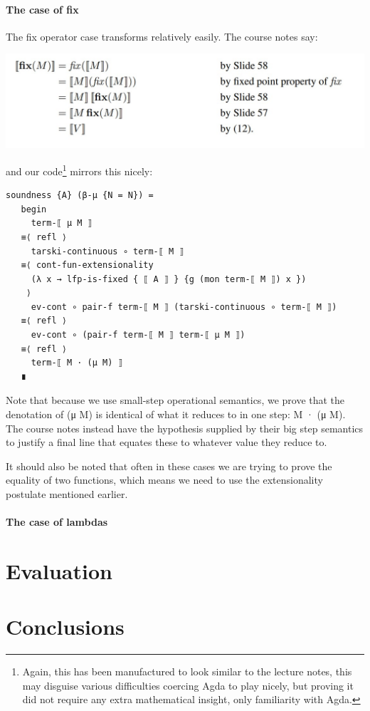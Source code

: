 \documentclass[12pt,a4paper,twoside,openright]{report}
\begin{document}
\subsubsection{The case of fix}
The fix operator case transforms relatively easily. The course notes say:
\begin{center}
\includegraphics[scale = 0.7]{figs/fix_soundness}
\end{center}
and our code\footnote{Again, this has been manufactured to look similar to the lecture notes, this may disguise various difficulties coercing Agda to play nicely, but proving it did not require any extra mathematical insight, only familiarity with Agda.} mirrors this nicely:
\begin{verbatim}
soundness {A} (β-μ {N = N}) =
   begin
     term-⟦ μ M ⟧
   ≡⟨ refl ⟩
     tarski-continuous ∘ term-⟦ M ⟧
   ≡⟨ cont-fun-extensionality
     (λ x → lfp-is-fixed { ⟦ A ⟧ } {g (mon term-⟦ M ⟧) x })
    ⟩
     ev-cont ∘ pair-f term-⟦ M ⟧ (tarski-continuous ∘ term-⟦ M ⟧)
   ≡⟨ refl ⟩
     ev-cont ∘ (pair-f term-⟦ M ⟧ term-⟦ μ M ⟧)
   ≡⟨ refl ⟩
     term-⟦ M · (μ M) ⟧
   ∎
\end{verbatim}
Note that because we use small-step operational semantics, we prove that the denotation of (μ M) is identical of what it reduces to in one step: M · (μ M). The course notes instead have the hypothesis supplied by their big step semantics to justify a final line that equates these to whatever value they reduce to. 

It should also be noted that often in these cases we are trying to prove the equality of two functions, which means we need to use the extensionality postulate mentioned earlier. 
\subsubsection{The case of lambdas}

\chapter{Evaluation}

\chapter{Conclusions}
\end{document}
